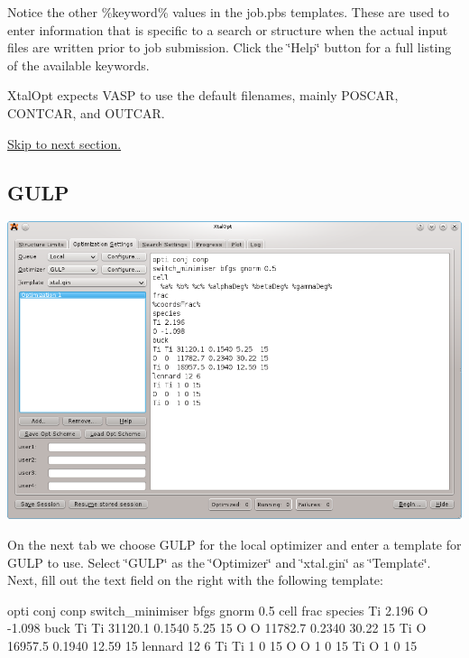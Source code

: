 Notice the other \%keyword\% values in the job.\+pbs templates. These are used to enter information that is specific to a search or structure when the actual input files are written prior to job submission. Click the \char`\"{}\+Help\char`\"{} button for a full listing of the available keywords.

Xtal\+Opt expects V\+A\+S\+P to use the default filenames, mainly P\+O\+S\+C\+A\+R, C\+O\+N\+T\+C\+A\+R, and O\+U\+T\+C\+A\+R.

\hyperlink{tut-xo_qisetup}{Skip to next section.}\hypertarget{tut-xo_gulp-opt}{}\subsection{G\+U\+L\+P}\label{tut-xo_gulp-opt}
 
\begin{DoxyImageNoCaption}
  \mbox{\includegraphics[width=\textwidth]{opt-set-gulp.png}}
\end{DoxyImageNoCaption}


On the next tab we choose G\+U\+L\+P for the local optimizer and enter a template for G\+U\+L\+P to use. Select \char`\"{}\+G\+U\+L\+P\char`\"{} as the \char`\"{}\+Optimizer\char`\"{} and \char`\"{}xtal.\+gin\char`\"{} as \char`\"{}\+Template\char`\"{}. Next, fill out the text field on the right with the following template\+: 
\begin{DoxyCode}
opti conj conp
switch\_minimiser bfgs gnorm 0.5
cell
frac
species
Ti 2.196
O -1.098
buck
Ti Ti 31120.1 0.1540 5.25  15
O  O  11782.7 0.2340 30.22 15
Ti O  16957.5 0.1940 12.59 15
lennard 12 6
Ti Ti 1 0 15
O  O  1 0 15
Ti O  1 0 15
\end{DoxyCode}


